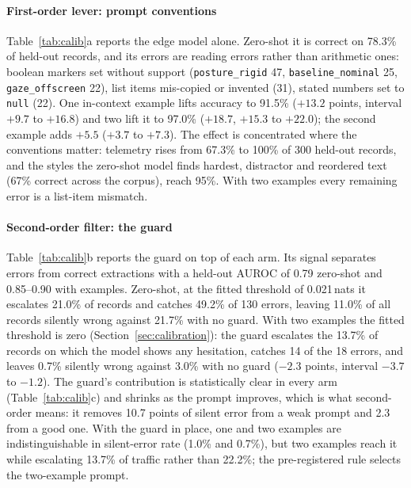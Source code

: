 \documentclass[conference]{IEEEtran}
\begin{document}
\paragraph{First-order lever: prompt conventions} Table~\ref{tab:calib}a reports the edge model alone. Zero-shot it is correct on 78.3\% of held-out records, and its errors are reading errors rather than arithmetic ones: boolean markers set without support (\texttt{posture\_rigid} 47, \texttt{baseline\_nominal} 25, \texttt{gaze\_offscreen} 22), list items mis-copied or invented (31), stated numbers set to \texttt{null} (22). One in-context example lifts accuracy to 91.5\% ($+13.2$ points, interval $+9.7$ to $+16.8$) and two lift it to 97.0\% ($+18.7$, $+15.3$ to $+22.0$); the second example adds $+5.5$ ($+3.7$ to $+7.3$). The effect is concentrated where the conventions matter: telemetry rises from 67.3\% to 100\% of 300 held-out records, and the styles the zero-shot model finds hardest, distractor and reordered text (67\% correct across the corpus), reach 95\%. With two examples every remaining error is a list-item mismatch.

\paragraph{Second-order filter: the guard} Table~\ref{tab:calib}b reports the guard on top of each arm. Its signal separates errors from correct extractions with a held-out AUROC of 0.79 zero-shot and 0.85--0.90 with examples. Zero-shot, at the fitted threshold of 0.021\,nats it escalates 21.0\% of records and catches 49.2\% of 130 errors, leaving 11.0\% of all records silently wrong against 21.7\% with no guard. With two examples the fitted threshold is zero (Section~\ref{sec:calibration}): the guard escalates the 13.7\% of records on which the model shows any hesitation, catches 14 of the 18 errors, and leaves 0.7\% silently wrong against 3.0\% with no guard ($-2.3$ points, interval $-3.7$ to $-1.2$). The guard's contribution is statistically clear in every arm (Table~\ref{tab:calib}c) and shrinks as the prompt improves, which is what second-order means: it removes 10.7 points of silent error from a weak prompt and 2.3 from a good one. With the guard in place, one and two examples are indistinguishable in silent-error rate (1.0\% and 0.7\%), but two examples reach it while escalating 13.7\% of traffic rather than 22.2\%; the pre-registered rule selects the two-example prompt.
\end{document}
